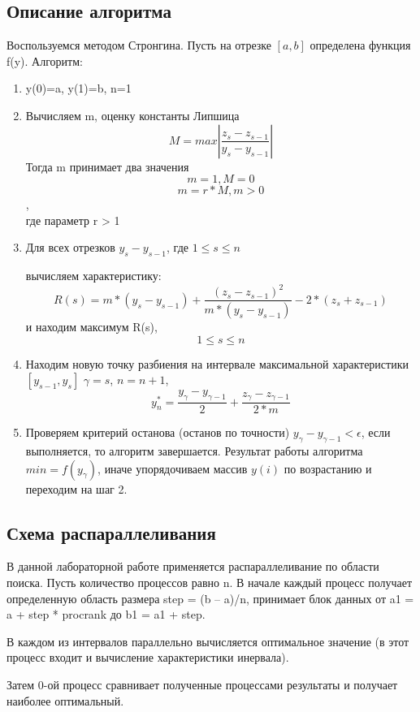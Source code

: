 \documentclass[a4paper]{report}
\begin{document}
\begin{center}
\section*{Описание алгоритма}
\end{center}
Воспользуемся методом Стронгина. Пусть на отрезке $[a,b]$ определена функция f(y).
Алгоритм:
\begin{enumerate}
\item y(0)=a, y(1)=b, n=1
\item Вычисляем m, оценку константы Липшица 
$$M = max\left|\frac{z_s - z_{s-1}}{y_s - y_{s-1}}\right|$$
Тогда m принимает два значения 
$$m = 1, M = 0$$
$$m = r*M, m > 0$$, \\
где параметр r > 1
\item Для всех отрезков $y_s - y_{s-1}$, где $1 \leq s \leq n$
\par вычисляем характеристику:
\begin{equation}
    R(s) = m*(y_s - y_{s-1}) + \frac{(z_s - z_{s-1})^2}{m*(y_s - y_{s-1})} -2*(z_s + z_{s-1})
\end{equation}
и находим максимум R(s), $$1 \leq s \leq n$$
\item Находим новую точку разбиения на интервале максимальной характеристики $[y_{s-1}, y_s]$
$\gamma = s$, $n = n + 1$,
\begin{equation}
    y_n^* = \frac{y_\gamma - y_{\gamma - 1}}{2} + \frac{z_\gamma - z_{\gamma - 1}}{2*m}
\end{equation}
\item Проверяем критерий останова (останов по точности) $y_\gamma - y_{\gamma - 1} < \epsilon$, если выполняется, то алгоритм завершается. Результат работы алгоритма $min = f(y_\gamma)$, иначе упорядочиваем массив $y(i)$ по возрастанию и переходим на шаг 2.
\end{enumerate}
\newpage

\begin{center}
\section*{Схема распараллеливания}
\end{center}
\par В данной лабораторной работе применяется распараллеливание по области поиска. Пусть
количество процессов равно n. В начале каждый процесс получает определенную область
размера step = (b – a)/n, принимает блок данных от a1 = a + step * procrank до b1 = a1 + step.
\par В каждом из интервалов параллельно вычисляется оптимальное значение (в этот процесс входит
и вычисление характеристики инервала).
\par Затем 0-ой процесс сравнивает полученные процессами результаты и получает наиболее
оптимальный.
\newpage
\end{document}
